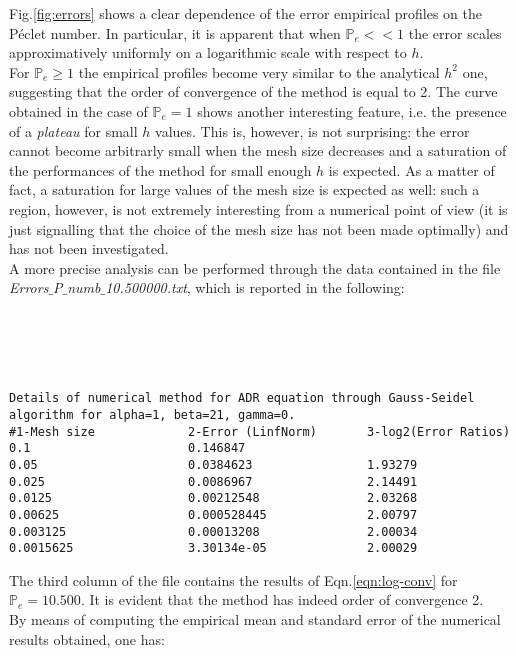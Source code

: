 \documentclass[11pt]{article}
\theoremstyle{theorem}
\theoremstyle{definition}
\begin{document}
Fig.\ref{fig:errors} shows a clear dependence of the error empirical profiles on the P\'{e}clet number. In particular, it is apparent that when $\mathbb{P}_e<<1$ the error scales approximatively uniformly on a logarithmic scale with respect to $ h $.\\
For $\mathbb{P}_e\ge 1$ the empirical profiles become very similar to the analytical $h^2$ one, suggesting that the order of convergence of the method is equal to 2. The curve obtained in the case of $\mathbb{P}_e=1$ shows another interesting feature, i.e. the presence of a \emph{plateau} for small $h$ values. This is, however, is not surprising: the error cannot become arbitrarly small when the mesh size decreases and a saturation of the performances of the method for small enough $h$ is expected. As a matter of fact, a saturation for large values of the mesh size is expected as well: such a region, however, is not extremely interesting from a numerical point of view (it is just signalling that the choice of the mesh size has not been made optimally) and has not been investigated.\\
A more precise analysis can be performed through the data contained in the file \emph{Errors$\_$P$\_$numb$\_$10.500000.txt}, which is reported in the following:
\\
\\
\\
\\
\\

  
\begin{lstlisting}
Details of numerical method for ADR equation through Gauss-Seidel algorithm for alpha=1, beta=21, gamma=0.
#1-Mesh size             2-Error (LinfNorm)       3-log2(Error Ratios)     
0.1                      0.146847                 	                        
0.05                     0.0384623                1.93279                  
0.025                    0.0086967                2.14491                  
0.0125                   0.00212548               2.03268                  
0.00625                  0.000528445              2.00797                  
0.003125                 0.00013208               2.00034                  
0.0015625                3.30134e-05              2.00029 
\end{lstlisting}


The third column of the file contains the results of Eqn.\eqref{eqn:log-conv} for $\mathbb{P}_e=10.500$. It is evident that the method has indeed order of convergence 2.\\
By means of computing the empirical mean and standard error of the numerical results obtained, one has:
\end{document}
